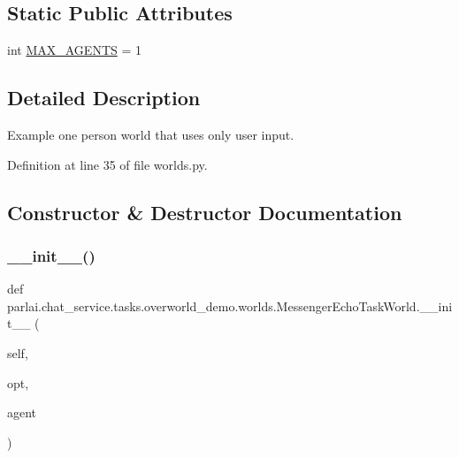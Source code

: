 \subsection*{Static Public Attributes}
\begin{DoxyCompactItemize}
\item 
int \hyperlink{classparlai_1_1chat__service_1_1tasks_1_1overworld__demo_1_1worlds_1_1MessengerEchoTaskWorld_a2bf81ef856313f96749fd0dbd7049582}{M\+A\+X\+\_\+\+A\+G\+E\+N\+TS} = 1
\end{DoxyCompactItemize}


\subsection{Detailed Description}
\begin{DoxyVerb}Example one person world that uses only user input.
\end{DoxyVerb}
 

Definition at line 35 of file worlds.\+py.



\subsection{Constructor \& Destructor Documentation}
\mbox{\label{classparlai_1_1chat__service_1_1tasks_1_1overworld__demo_1_1worlds_1_1MessengerEchoTaskWorld_aea9e37c8acd753234d74bbd6bde07870}} 
\subsubsection{\texorpdfstring{\+\_\+\+\_\+init\+\_\+\+\_\+()}{\_\_init\_\_()}}
{\footnotesize\ttfamily def parlai.\+chat\+\_\+service.\+tasks.\+overworld\+\_\+demo.\+worlds.\+Messenger\+Echo\+Task\+World.\+\_\+\+\_\+init\+\_\+\+\_\+ (\begin{DoxyParamCaption}\item[{}]{self,  }\item[{}]{opt,  }\item[{}]{agent }\end{DoxyParamCaption})}



